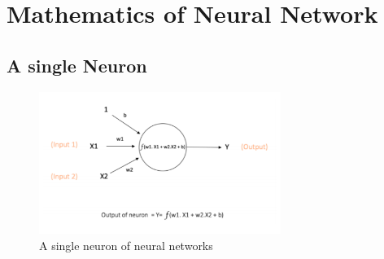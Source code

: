 \documentclass[a4paper,11pt,oneside]{book}
\begin{document}

\section{Mathematics of Neural Network}



\subsection{A single Neuron}
\begin{figure}[!h]
	\centering
	\includegraphics[width=0.7\textwidth]{figures/neuron}
	\caption{A single neuron of neural networks}
	\label{secondfig}
\end{figure}
\end{document}
